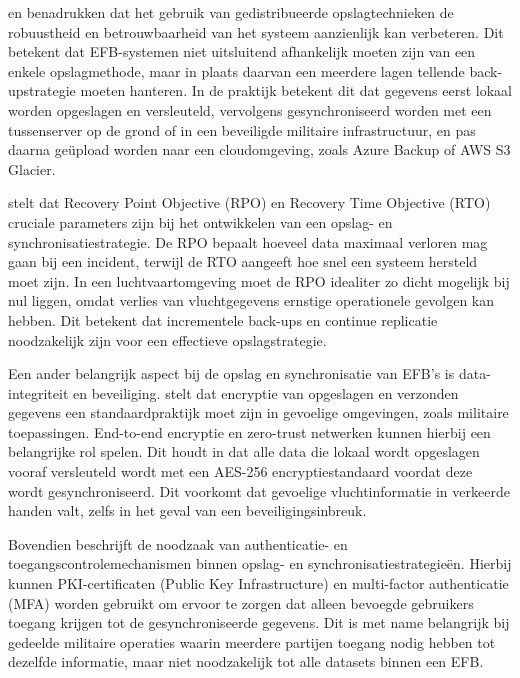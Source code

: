 \textcite{AWSBackup} en \textcite{MicrosoftBackup} benadrukken dat het gebruik van gedistribueerde opslagtechnieken de robuustheid en betrouwbaarheid van het systeem aanzienlijk kan verbeteren. Dit betekent dat EFB-systemen niet uitsluitend afhankelijk moeten zijn van een enkele opslagmethode, maar in plaats daarvan een meerdere lagen tellende back-upstrategie moeten hanteren. In de praktijk betekent dit dat gegevens eerst lokaal worden opgeslagen en versleuteld, vervolgens gesynchroniseerd worden met een tussenserver op de grond of in een beveiligde militaire infrastructuur, en pas daarna geüpload worden naar een cloudomgeving, zoals Azure Backup of AWS S3 Glacier.

\textcite{VeeamRTO} stelt dat Recovery Point Objective (RPO) en Recovery Time Objective (RTO) cruciale parameters zijn bij het ontwikkelen van een opslag- en synchronisatiestrategie. De RPO bepaalt hoeveel data maximaal verloren mag gaan bij een incident, terwijl de RTO aangeeft hoe snel een systeem hersteld moet zijn. In een luchtvaartomgeving moet de RPO idealiter zo dicht mogelijk bij nul liggen, omdat verlies van vluchtgegevens ernstige operationele gevolgen kan hebben. Dit betekent dat incrementele back-ups en continue replicatie noodzakelijk zijn voor een effectieve opslagstrategie. 

Een ander belangrijk aspect bij de opslag en synchronisatie van EFB’s is data-integriteit en beveiliging. \textcite{NISTFIPS140} stelt dat encryptie van opgeslagen en verzonden gegevens een standaardpraktijk moet zijn in gevoelige omgevingen, zoals militaire toepassingen. End-to-end encryptie en zero-trust netwerken kunnen hierbij een belangrijke rol spelen. Dit houdt in dat alle data die lokaal wordt opgeslagen vooraf versleuteld wordt met een AES-256 encryptiestandaard voordat deze wordt gesynchroniseerd. Dit voorkomt dat gevoelige vluchtinformatie in verkeerde handen valt, zelfs in het geval van een beveiligingsinbreuk.

Bovendien beschrijft \textcite{EFBDataSecurity} de noodzaak van authenticatie- en toegangscontrolemechanismen binnen opslag- en synchronisatiestrategieën. Hierbij kunnen PKI-certificaten (Public Key Infrastructure) en multi-factor authenticatie (MFA) worden gebruikt om ervoor te zorgen dat alleen bevoegde gebruikers toegang krijgen tot de gesynchroniseerde gegevens. Dit is met name belangrijk bij gedeelde militaire operaties waarin meerdere partijen toegang nodig hebben tot dezelfde informatie, maar niet noodzakelijk tot alle datasets binnen een EFB.

